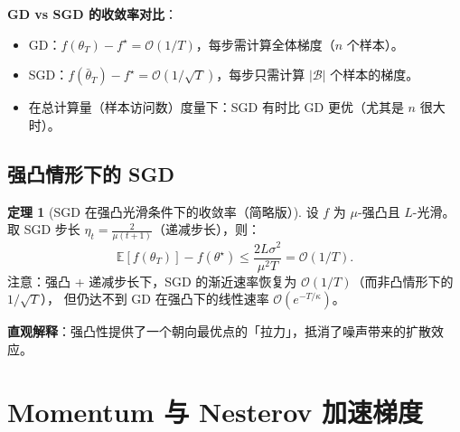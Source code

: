 \documentclass[12pt,a4paper]{ctexart}
\theoremstyle{definition}
\newtheorem{theorem}{定理}[section]
\theoremstyle{plain}
\newcommand{\E}{\mathbb{E}}
\begin{document}
\textbf{GD vs SGD 的收敛率对比}：
\begin{itemize}
  \item GD：$f(\theta_T) - f^\star = \mathcal{O}(1/T)$，每步需计算全体梯度（$n$ 个样本）。
  \item SGD：$f(\bar\theta_T) - f^\star = \mathcal{O}(1/\sqrt{T})$，每步只需计算 $|\mathcal{B}|$ 个样本的梯度。
  \item 在总计算量（样本访问数）度量下：SGD 有时比 GD 更优（尤其是 $n$ 很大时）。
\end{itemize}

\begin{center}
\end{center}

\subsection{强凸情形下的 SGD}

\begin{theorem}[SGD 在强凸光滑条件下的收敛率（简略版）]\label{thm:sgd-strconv}
  设 $f$ 为 $\mu$-强凸且 $L$-光滑。取 SGD 步长 $\eta_t = \frac{2}{\mu(t+1)}$（递减步长），则：
  \begin{equation}
    \E[f(\theta_T)] - f(\theta^\star) \le \frac{2L\sigma^2}{\mu^2 T} = \mathcal{O}(1/T).
  \end{equation}
  注意：强凸 + 递减步长下，SGD 的渐近速率恢复为 $\mathcal{O}(1/T)$（而非凸情形下的 $1/\sqrt{T}$），
  但仍达不到 GD 在强凸下的线性速率 $\mathcal{O}(e^{-T/\kappa})$。
\end{theorem}

\textbf{直观解释}：强凸性提供了一个朝向最优点的「拉力」，抵消了噪声带来的扩散效应。

\section{Momentum 与 Nesterov 加速梯度}
\end{document}
